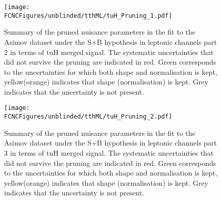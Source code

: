 \begin{figure}[htb]
\centering
\texttt{[image: \\FCNCFigures/unblinded/tthML/tuH\_Pruning\_1.pdf]}
\caption{ Summary of the pruned nuisance parameters in the fit to the  Asimov dataset under the S+B hypothesis in leptonic channels part 2 in terms of tuH merged signal. The systematic uncertainties that did not survive the pruning are indicated in red. Green corresponds to the uncertainties for which both shape and normalisation is kept, yellow(orange) indicates that shape (normalisation) is kept. Grey indicates that the uncertainty is not present. }
\label{fig:tthML_pruning_1}
\end{figure}

\begin{figure}[htb]
\centering
\texttt{[image: \\FCNCFigures/unblinded/tthML/tuH\_Pruning\_2.pdf]}
\caption{ Summary of the pruned nuisance parameters in the fit to the  Asimov dataset under the S+B hypothesis in leptonic channels part 3 in terms of tuH merged signal. The systematic uncertainties that did not survive the pruning are indicated in red. Green corresponds to the uncertainties for which both shape and normalisation is kept, yellow(orange) indicates that shape (normalisation) is kept. Grey indicates that the uncertainty is not present.}
\label{fig:tthML_pruning_2}
\end{figure}









